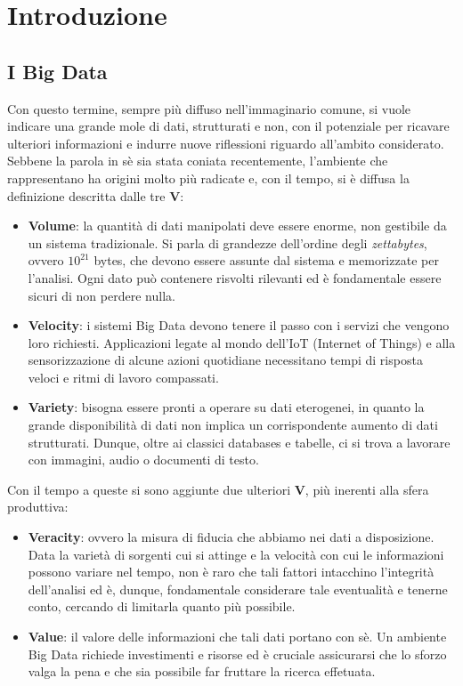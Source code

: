 \chapter{Introduzione}

\section{I Big Data}
Con questo termine, sempre più diffuso nell'immaginario comune, si vuole indicare una grande mole di dati, strutturati e non, con il potenziale per ricavare ulteriori informazioni e indurre nuove riflessioni riguardo all'ambito considerato.\\
Sebbene la parola in sè sia stata coniata recentemente, l'ambiente che rappresentano ha origini molto più radicate e, con il tempo, si è diffusa la definizione descritta dalle tre \textbf{V}:

\begin{itemize}
	\item \textbf{Volume}: la quantità di dati manipolati deve essere enorme, non gestibile da un sistema tradizionale. Si parla di grandezze dell'ordine degli \textit{zettabytes}, ovvero $10^{21}$ bytes, che devono essere assunte dal sistema e memorizzate per l'analisi. Ogni dato può contenere risvolti rilevanti ed è fondamentale essere sicuri di non perdere nulla. 
	
	\item \textbf{Velocity}: i sistemi Big Data devono tenere il passo con i servizi che vengono loro richiesti. Applicazioni legate al mondo dell'IoT (Internet of Things) e alla sensorizzazione di alcune azioni quotidiane necessitano tempi di risposta veloci e ritmi di lavoro compassati.
	
	\item \textbf{Variety}: bisogna essere pronti a operare su dati eterogenei, in quanto la grande disponibilità di dati non implica un corrispondente aumento di dati strutturati. Dunque, oltre ai classici databases e tabelle, ci si trova a lavorare con immagini, audio o documenti di testo.
\end{itemize}
Con il tempo a queste si sono aggiunte due ulteriori \textbf{V}, più inerenti alla sfera produttiva:

\begin{itemize}
	\item \textbf{Veracity}: ovvero la misura di fiducia che abbiamo nei dati a disposizione. Data la varietà di sorgenti cui si attinge e la velocità con cui le informazioni possono variare nel tempo, non è raro che tali fattori intacchino l'integrità dell'analisi ed è, dunque, fondamentale considerare tale eventualità e tenerne conto, cercando di limitarla quanto più possibile.
	
	\item \textbf{Value}: il valore delle informazioni che tali dati portano con sè. Un ambiente Big Data richiede investimenti e risorse ed è cruciale assicurarsi che lo sforzo valga la pena e che sia possibile far fruttare la ricerca effetuata.
\end{itemize}

